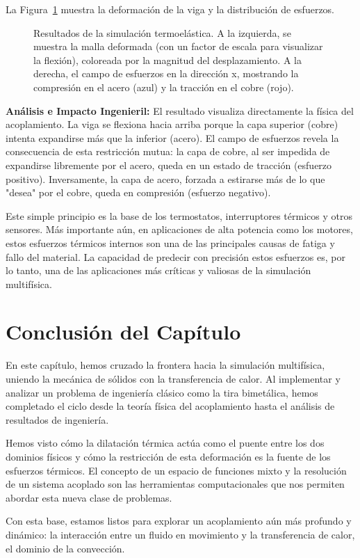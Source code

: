 La Figura~\ref{fig:thermo-result} muestra la deformación de la viga y la distribución de esfuerzos.

\begin{figure}[h!]
    \centering
    \caption{Resultados de la simulación termoelástica. A la izquierda, se muestra la malla deformada (con un factor de escala para visualizar la flexión), coloreada por la magnitud del desplazamiento. A la derecha, el campo de esfuerzos en la dirección x, mostrando la compresión en el acero (azul) y la tracción en el cobre (rojo).}
    \label{fig:thermo-result}
\end{figure}

\textbf{Análisis e Impacto Ingenieril:} El resultado visualiza directamente la física del acoplamiento. La viga se flexiona hacia arriba porque la capa superior (cobre) intenta expandirse más que la inferior (acero). El campo de esfuerzos revela la consecuencia de esta restricción mutua: la capa de cobre, al ser impedida de expandirse libremente por el acero, queda en un estado de tracción (esfuerzo positivo). Inversamente, la capa de acero, forzada a estirarse más de lo que "desea" por el cobre, queda en compresión (esfuerzo negativo).

Este simple principio es la base de los termostatos, interruptores térmicos y otros sensores. Más importante aún, en aplicaciones de alta potencia como los motores, estos esfuerzos térmicos internos son una de las principales causas de fatiga y fallo del material. La capacidad de predecir con precisión estos esfuerzos es, por lo tanto, una de las aplicaciones más críticas y valiosas de la simulación multifísica.

\section*{Conclusión del Capítulo}
En este capítulo, hemos cruzado la frontera hacia la simulación multifísica, uniendo la mecánica de sólidos con la transferencia de calor. Al implementar y analizar un problema de ingeniería clásico como la tira bimetálica, hemos completado el ciclo desde la teoría física del acoplamiento hasta el análisis de resultados de ingeniería.

Hemos visto cómo la dilatación térmica actúa como el puente entre los dos dominios físicos y cómo la restricción de esta deformación es la fuente de los esfuerzos térmicos. El concepto de un espacio de funciones mixto y la resolución de un sistema acoplado son las herramientas computacionales que nos permiten abordar esta nueva clase de problemas.

Con esta base, estamos listos para explorar un acoplamiento aún más profundo y dinámico: la interacción entre un fluido en movimiento y la transferencia de calor, el dominio de la convección.